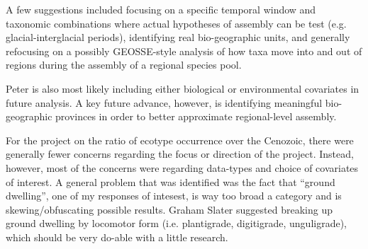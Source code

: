 \documentclass{article}
\begin{document}
A few suggestions included focusing on a specific temporal window and taxonomic combinations where actual hypotheses of assembly can be test (e.g. glacial-interglacial periods), identifying real bio-geographic units, and generally refocusing on a possibly \uppercase{geosse}-style analysis of how taxa move into and out of regions during the assembly of a regional species pool. 

Peter is also most likely including either biological or environmental covariates in future analysis. A key future advance, however, is identifying meaningful bio-geographic provinces in order to better approximate regional-level assembly.

For the project on the ratio of ecotype occurrence over the Cenozoic, there were generally fewer concerns regarding the focus or direction of the project. Instead, however, most of the concerns were regarding data-types and choice of covariates of interest. A general problem that was identified was the fact that ``ground dwelling'', one of my responses of intesest, is way too broad a category and is skewing/obfuscating possible results. Graham Slater suggested breaking up ground dwelling by locomotor form (i.e. plantigrade, digitigrade, unguligrade), which should be very do-able with a little research. 
\end{document}
